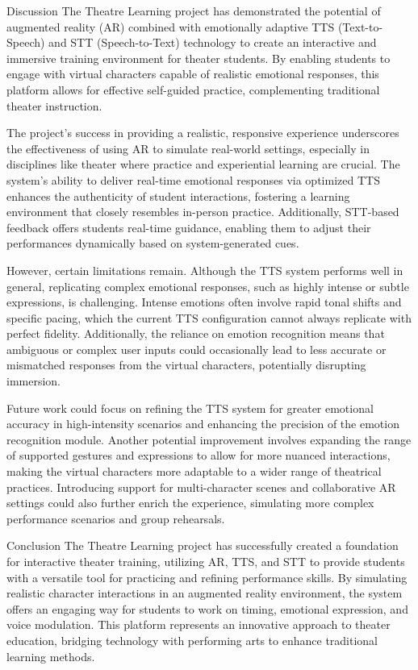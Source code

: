 Discussion
The Theatre Learning project has demonstrated the potential of augmented reality (AR) combined with emotionally adaptive TTS (Text-to-Speech) and STT (Speech-to-Text) technology to create an interactive and immersive training environment for theater students. By enabling students to engage with virtual characters capable of realistic emotional responses, this platform allows for effective self-guided practice, complementing traditional theater instruction.

The project’s success in providing a realistic, responsive experience underscores the effectiveness of using AR to simulate real-world settings, especially in disciplines like theater where practice and experiential learning are crucial. The system’s ability to deliver real-time emotional responses via optimized TTS enhances the authenticity of student interactions, fostering a learning environment that closely resembles in-person practice. Additionally, STT-based feedback offers students real-time guidance, enabling them to adjust their performances dynamically based on system-generated cues.

However, certain limitations remain. Although the TTS system performs well in general, replicating complex emotional responses, such as highly intense or subtle expressions, is challenging. Intense emotions often involve rapid tonal shifts and specific pacing, which the current TTS configuration cannot always replicate with perfect fidelity. Additionally, the reliance on emotion recognition means that ambiguous or complex user inputs could occasionally lead to less accurate or mismatched responses from the virtual characters, potentially disrupting immersion.

Future work could focus on refining the TTS system for greater emotional accuracy in high-intensity scenarios and enhancing the precision of the emotion recognition module. Another potential improvement involves expanding the range of supported gestures and expressions to allow for more nuanced interactions, making the virtual characters more adaptable to a wider range of theatrical practices. Introducing support for multi-character scenes and collaborative AR settings could also further enrich the experience, simulating more complex performance scenarios and group rehearsals.

Conclusion
The Theatre Learning project has successfully created a foundation for interactive theater training, utilizing AR, TTS, and STT to provide students with a versatile tool for practicing and refining performance skills. By simulating realistic character interactions in an augmented reality environment, the system offers an engaging way for students to work on timing, emotional expression, and voice modulation. This platform represents an innovative approach to theater education, bridging technology with performing arts to enhance traditional learning methods.

